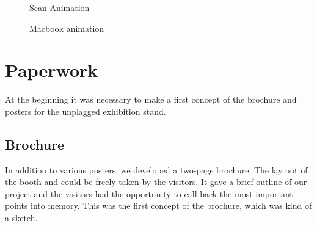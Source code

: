 \begin{figure}[!hbtp]
  \centering
  \caption{Scan Animation}
  \label{fig:scan-animation}
\end{figure}

\begin{figure}[!hbtp]
  \centering
  \caption{Macbook animation}
  \label{fig:macbook}
\end{figure}

\pagebreak 


\section{Paperwork}
At the beginning it was necessary to make a first concept of the brochure and posters for the unplagged exhibition stand.

\subsection{Brochure}


In addition to various posters, we developed a two-page brochure. The lay out of the booth and could be freely taken by the visitors. It gave a brief outline of our project and the visitors had the opportunity to call back the most important points into memory.
This was the first concept of the brochure, which was kind of a sketch.





